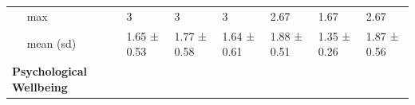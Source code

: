 \documentclass[
  english,
  man,floatsintext]{apa6}
\begin{document}
\begin{longtable}[]{@{}lllllll@{}}
\begin{minipage}[t]{0.16\columnwidth}\raggedright
~~ max\strut
\end{minipage} & \begin{minipage}[t]{0.11\columnwidth}\raggedright
3\strut
\end{minipage} & \begin{minipage}[t]{0.11\columnwidth}\raggedright
3\strut
\end{minipage} & \begin{minipage}[t]{0.11\columnwidth}\raggedright
3\strut
\end{minipage} & \begin{minipage}[t]{0.11\columnwidth}\raggedright
2.67\strut
\end{minipage} & \begin{minipage}[t]{0.11\columnwidth}\raggedright
1.67\strut
\end{minipage} & \begin{minipage}[t]{0.11\columnwidth}\raggedright
2.67\strut
\end{minipage}\tabularnewline
\begin{minipage}[t]{0.16\columnwidth}\raggedright
~~ mean (sd)\strut
\end{minipage} & \begin{minipage}[t]{0.11\columnwidth}\raggedright
1.65 ± 0.53\strut
\end{minipage} & \begin{minipage}[t]{0.11\columnwidth}\raggedright
1.77 ± 0.58\strut
\end{minipage} & \begin{minipage}[t]{0.11\columnwidth}\raggedright
1.64 ± 0.61\strut
\end{minipage} & \begin{minipage}[t]{0.11\columnwidth}\raggedright
1.88 ± 0.51\strut
\end{minipage} & \begin{minipage}[t]{0.11\columnwidth}\raggedright
1.35 ± 0.26\strut
\end{minipage} & \begin{minipage}[t]{0.11\columnwidth}\raggedright
1.87 ± 0.56\strut
\end{minipage}\tabularnewline
\begin{minipage}[t]{0.16\columnwidth}\raggedright
\textbf{Psychological Wellbeing}\strut
\end{minipage} & \begin{minipage}[t]{0.11\columnwidth}\raggedright
~~\strut
\end{minipage} & \begin{minipage}[t]{0.11\columnwidth}\raggedright

\end{minipage}
\end{longtable}
\end{document}
